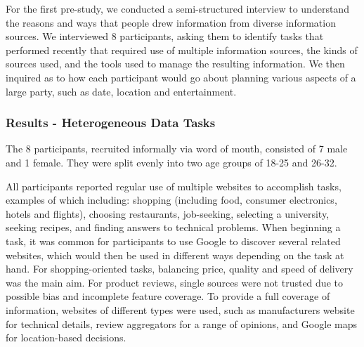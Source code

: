 \documentclass{sigchi}
\begin{document}
For the first pre-study, we conducted a semi-structured interview to understand the reasons and ways that people drew information from diverse information sources. We interviewed 8 participants, asking them to identify tasks that performed recently that required use of multiple information sources, the kinds of sources used, and the tools used to manage the resulting information.  We then inquired as to how each participant would go about planning various aspects of a large party, such as date, location and entertainment.

\subsubsection{Results - Heterogeneous Data Tasks}

The 8 participants, recruited informally via word of mouth, consisted of 7 male and 1 female. They were split evenly into two age groups of 18-25 and 26-32.   

All participants reported regular use of multiple websites to accomplish tasks, examples of which including: shopping (including food, consumer electronics, hotels and flights), choosing restaurants, job-seeking, selecting a university, seeking recipes, and finding answers to technical problems.  When beginning a task, it was common for participants to use Google to discover several related websites, which would then be used in different ways depending on the task at hand. For shopping-oriented tasks, balancing price, quality and speed of delivery was the main aim.  For product reviews, single sources were not trusted due to possible bias and incomplete feature coverage.  
To provide a full coverage of information, websites of different types were used, such as manufacturers website for technical details, review aggregators for a range of opinions, and Google maps for location-based decisions.
\end{document}
